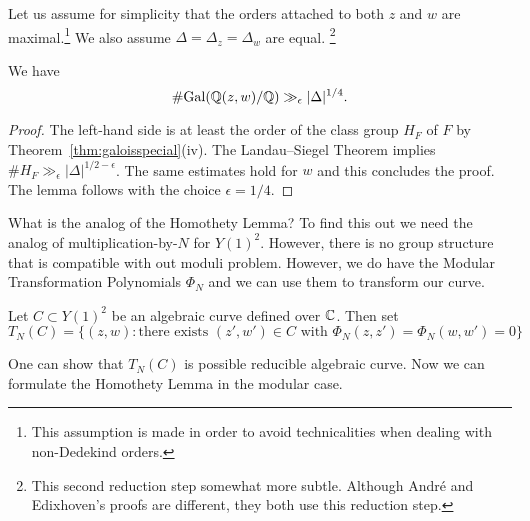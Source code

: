 Let us assume for simplicity that the orders attached to 
both $z$ and $w$ are maximal.\footnote{This assumption is made in
  order to avoid technicalities when dealing with non-Dedekind
  orders.}
We also assume $\Delta =
\Delta_z=\Delta_w$ are equal. \footnote{This second reduction step
  somewhat more subtle.
  Although Andr\'e and Edixhoven's proofs are different, they both use
  this reduction step.}

\begin{lemma}
  \label{lem:lgocm}
  We have
  \begin{equation*}
    \# \mathrm{Gal}({\mathbb{Q}}(z,w)/{\mathbb{Q}}) \gg_\epsilon
    |\Delta|^{1/4}. 
  \end{equation*}
\end{lemma}
\begin{proof}
  The left-hand side is at least the order of the class group $H_F$ of $F$ by
  Theorem~\ref{thm:galoisspecial}(iv). The Landau--Siegel Theorem
  implies $\# H_F \gg_\epsilon |\Delta|^{1/2-\epsilon}$. 
  The same estimates hold for $w$ and this concludes the proof.
  The lemma follows with the choice $\epsilon =1/4$. 
\end{proof}

What is the analog of the Homothety Lemma? To find this out we need
the analog of multiplication-by-$N$ for $Y(1)^2$. However, there is
no group structure that is compatible with out moduli problem.
However, we do have the Modular Transformation Polynomials $\Phi_N$
and we can use them to transform our curve.

\begin{definition}
  Let $C\subset Y(1)^2$ be an algebraic curve defined over ${\mathbb{C}}$. Then set
  \begin{equation*}
    T_N(C) = \{(z,w) : \text{there exists $(z',w')\in C$ with $\Phi_N(z,z')=\Phi_N(w,w')=0$}\}
  \end{equation*}  
\end{definition}

One can show that $T_N(C)$ is possible reducible algebraic curve.
Now we can formulate the Homothety Lemma in the modular case.

